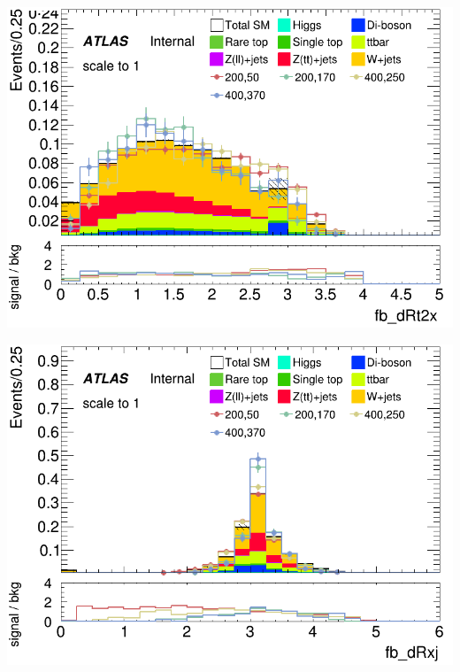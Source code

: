 \documentclass[usenames,dvipsnames]{beamer}
\begin{document}
\begin{frame}
    \begin{minipage}{0.32\textwidth}
        \centering
        \includegraphics[width=\textwidth]{graphics/LH_met_sig/LH_fb_dRt2x_norm.png}
    \end{minipage}
    \hfill
    \begin{minipage}{0.32\textwidth}
        \centering
        \includegraphics[width=\textwidth]{graphics/LH_met_sig/LH_fb_dRxj_norm.png}
    \end{minipage}
    \hfill
    \begin{minipage}{0.32\textwidth}
        \centering

\end{minipage}
\end{frame}
\end{document}
